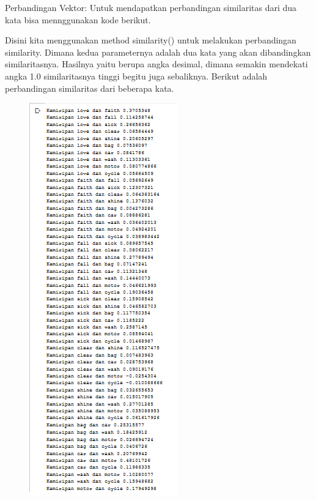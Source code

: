 \begin{enumerate}
	\hfill\break
	Perbandingan Vektor:
	\hfill\break
	Untuk mendapatkan perbandingan similaritas dari dua kata bisa mennggunakan kode berikut.
	
	Disini kita menggunakan method similarity() untuk melakukan perbandingan similarity. Dimana kedua parameternya adalah dua kata yang akan dibandingkan similaritasnya. Hasilnya yaitu berupa angka desimal, dimana semakin mendekati angka 1.0 similaritasnya tinggi begitu juga sebaliknya.
	\hfill\break
	Berikut adalah perbandingan similaritas dari beberapa kata.
	\hfill\break
	\begin{figure}[H]
	\centering
		\includegraphics[width=8 cm]{figures/1174006/chapter5/soalpraktek/similarity.PNG}
	\end{figure}


\end{enumerate}
